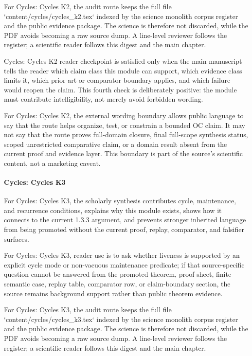 For Cycles: Cycles K2, the audit route keeps the full file `content/cycles/cycles\_k2.tex` indexed by the science monolith corpus register and the public evidence package. The science is therefore not discarded, while the PDF avoids becoming a raw source dump. A line-level reviewer follows the register; a scientific reader follows this digest and the main chapter.


Cycles: Cycles K2 reader checkpoint is satisfied only when the main manuscript tells the reader which claim class this module can support, which evidence class limits it, which prior-art or comparator boundary applies, and which failure would reopen the claim. This fourth check is deliberately positive: the module must contribute intelligibility, not merely avoid forbidden wording.


For Cycles: Cycles K2, the external wording boundary allows public language to say that the route helps organize, test, or constrain a bounded OC claim. It may not say that the route proves full-domain closure, final full-scope synthesis status, scoped unrestricted comparative claim, or a domain result absent from the current proof and evidence layer. This boundary is part of the source's scientific content, not a marketing caveat.


\paragraph{Cycles: Cycles K3}

For Cycles: Cycles K3, the scholarly synthesis contributes cycle, maintenance, and recurrence conditions, explains why this module exists, shows how it connects to the current 1.3.3 argument, and prevents stronger inherited language from being promoted without the current proof, replay, comparator, and falsifier surfaces.


For Cycles: Cycles K3, reader use is to ask whether liveness is supported by an explicit cycle mode or non-vacuous maintenance predicate; if that source-specific question cannot be answered from the promoted theorem, proof sheet, finite semantic case, replay table, comparator row, or claim-boundary section, the source remains background support rather than public theorem evidence.


For Cycles: Cycles K3, the audit route keeps the full file `content/cycles/cycles\_k3.tex` indexed by the science monolith corpus register and the public evidence package. The science is therefore not discarded, while the PDF avoids becoming a raw source dump. A line-level reviewer follows the register; a scientific reader follows this digest and the main chapter.


